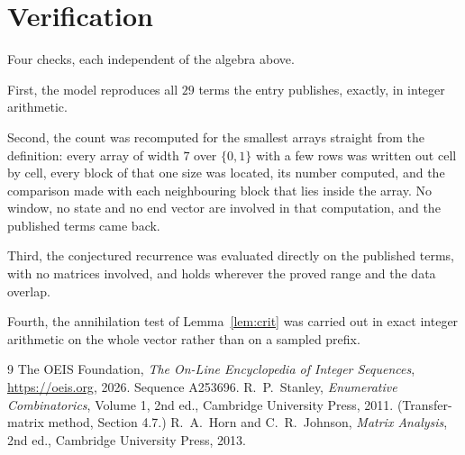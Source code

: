 \documentclass[11pt,a4paper]{article}
\theoremstyle{plain}
\theoremstyle{definition}
\begin{document}
\section{Verification}

Four checks, each independent of the algebra above.

First, the model reproduces all $29$ terms the entry publishes, exactly, in integer
arithmetic.

Second, the count was recomputed for the smallest arrays straight from the definition: every
array of width $7$ over $\{0,1\}$ with a few rows was written out cell by cell, every block of
that one size was located, its number computed, and the comparison made with each neighbouring block
that lies inside the array. No window, no state and no end vector are involved in that
computation, and the published terms came back.

Third, the conjectured recurrence was evaluated directly on the published terms, with no
matrices involved, and holds wherever the proved range and the data overlap.

Fourth, the annihilation test of Lemma~\ref{lem:crit} was carried out in exact integer
arithmetic on the whole vector rather than on a sampled prefix.

\begin{thebibliography}{9}
 The OEIS Foundation, \emph{The On-Line Encyclopedia of Integer
Sequences}, \url{https://oeis.org}, 2026. Sequence A253696.
 R.~P.~Stanley, \emph{Enumerative Combinatorics}, Volume 1, 2nd ed.,
Cambridge University Press, 2011. (Transfer-matrix method, Section 4.7.)
 R.~A.~Horn and C.~R.~Johnson, \emph{Matrix Analysis}, 2nd ed., Cambridge
University Press, 2013.
\end{thebibliography}
\end{document}
